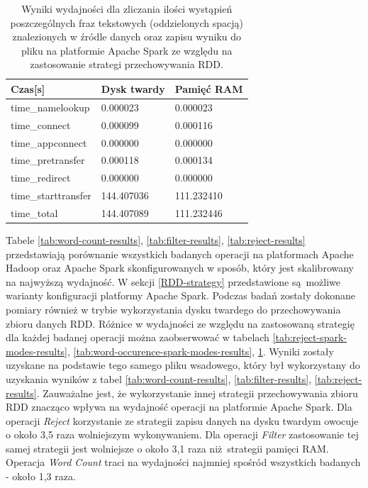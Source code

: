 \begin{table}[]
	\centering
	\caption{Wyniki wydajności dla zliczania ilości wystąpień poszczególnych fraz tekstowych (oddzielonych spacją) znalezionych w źródle danych oraz zapisu wyniku do pliku na platformie Apache Spark ze względu na zastosowanie strategi przechowywania RDD.}
	\label{tab:word-count-spark-modes-results}
	\begin{tabular}{|l|l|l|}
		\hline
		Czas{[}s{]}         & Dysk twardy & Pamięć RAM \\ \hline
		time\_namelookup    & 0.000023    & 0.000023   \\ \hline
		time\_connect       & 0.000099    & 0.000116   \\ \hline
		time\_appconnect    & 0.000000    & 0.000000   \\ \hline
		time\_pretransfer   & 0.000118    & 0.000134   \\ \hline
		time\_redirect      & 0.000000    & 0.000000   \\ \hline
		time\_starttransfer & 144.407036  & 111.232410 \\ \hline
		time\_total         & 144.407089  & 111.232446 \\ \hline
	\end{tabular}
\end{table}
Tabele \ref{tab:word-count-results}, \ref{tab:filter-results}, \ref{tab:reject-results} przedstawiają porównanie wszystkich badanych operacji na platformach Apache Hadoop oraz Apache Spark skonfigurowanych w sposób, który jest skalibrowany na najwyższą wydajność. W sekcji \ref{RDD-strategy} przedstawione są możliwe warianty konfiguracji platformy Apache Spark. Podczas badań zostały dokonane pomiary również w trybie wykorzystania dysku twardego do przechowywania zbioru danych RDD. Różnice w wydajności ze względu na zastosowaną strategię dla każdej badanej operacji można zaobserwować w tabelach \ref{tab:reject-spark-modes-results}, \ref{tab:word-occurence-spark-modes-results}, \ref{tab:word-count-spark-modes-results}. Wyniki zostały uzyskane na podstawie tego samego pliku wsadowego, który był wykorzystany do uzyskania wyników z tabel  \ref{tab:word-count-results}, \ref{tab:filter-results}, \ref{tab:reject-results}. Zauważalne jest, że wykorzystanie innej strategii przechowywania zbioru RDD znacząco wpływa na wydajność operacji na platformie Apache Spark. Dla operacji \textit{Reject} korzystanie ze strategii zapisu danych na dysku twardym owocuje o około 3,5 raza wolniejszym wykonywaniem. Dla operacji \textit{Filter}  zastosowanie tej samej strategii jest wolniejsze o około 3,1 raza niż strategii pamięci RAM. Operacja \textit{Word Count} traci na wydajności najmniej spośród wszystkich badanych - około 1,3 raza.  
